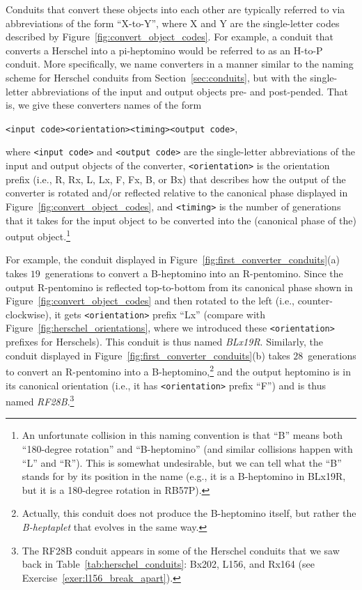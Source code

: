 Conduits that convert these objects into each other are typically referred to via abbreviations of the form ``X-to-Y'', where X and Y are the single-letter codes described by Figure~\ref{fig:convert_object_codes}. For example, a conduit that converts a Herschel into a pi-heptomino would be referred to as an H-to-P conduit. More specifically, we name converters in a manner similar to the naming scheme for Herschel conduits from Section~\ref{sec:conduits}, but with the single-letter abbreviations of the input and output objects pre- and post-pended. That is, we give these converters names of the form
\begin{center}
	\verb|<input code><orientation><timing><output code>|,
\end{center}
\noindent where \verb|<input code>| and \verb|<output code>| are the single-letter abbreviations of the input and output objects of the converter, \verb|<orientation>| is the orientation prefix (i.e., R, Rx, L, Lx, F, Fx, B, or Bx) that describes how the output of the converter is rotated and/or reflected relative to the canonical phase displayed in Figure~\ref{fig:convert_object_codes}, and \verb|<timing>| is the number of generations that it takes for the input object to be converted into the (canonical phase of the) output object.\footnote{An unfortunate collision in this naming convention is that ``B'' means both ``180-degree rotation'' and ``B-heptomino'' (and similar collisions happen with ``L'' and ``R''). This is somewhat undesirable, but we can tell what the ``B'' stands for by its position in the name (e.g., it is a B-heptomino in BLx19R, but it is a 180-degree rotation in RB57P).}

For example, the conduit displayed in Figure~\ref{fig:first_converter_conduits}(a) takes $19$~generations to convert a B-heptomino into an R-pentomino. Since the output R-pentomino is reflected top-to-bottom from its canonical phase shown in Figure~\ref{fig:convert_object_codes} and then rotated to the left (i.e., counter-clockwise), it gets \verb|<orientation>| prefix ``Lx'' (compare with Figure~\ref{fig:herschel_orientations}, where we introduced these \verb|<orientation>| prefixes for Herschels). This conduit is thus named \emph{BLx19R}. Similarly, the conduit displayed in Figure~\ref{fig:first_converter_conduits}(b) takes $28$~generations to convert an R-pentomino into a B-heptomino,\footnote{Actually, this conduit does not produce the B-heptomino itself, but rather the \emph{B-heptaplet} that evolves in the same way.} and the output heptomino is in its canonical orientation (i.e., it has \verb|<orientation>| prefix ``F'') and is thus named \emph{RF28B}.\footnote{The RF28B conduit appears in some of the Herschel conduits that we saw back in Table~\ref{tab:herschel_conduits}: Bx202, L156, and Rx164 (see Exercise~\ref{exer:l156_break_apart}).}

